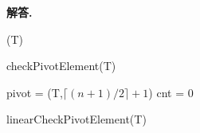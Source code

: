 \documentclass[12pt, a4paper, oneside]{article}
\newenvironment{solution}{\par\noindent\textbf{解答. }}{}
\begin{document}
\begin{solution}
\begin{enumerate}
        \begin{algorithm}
            \Sort(T)\;
            \;
            \caption{checkPivotElement(T)}
        \end{algorithm}
         \begin{algorithm}
          \;
            pivot = \linearSelect(T,$\lceil (n+1)/2\rceil+1$)\;
            cnt = 0\;
            {}
            \caption{linearCheckPivotElement(T)}
        \end{algorithm}
    \end{enumerate}
\end{solution}
\end{document}
